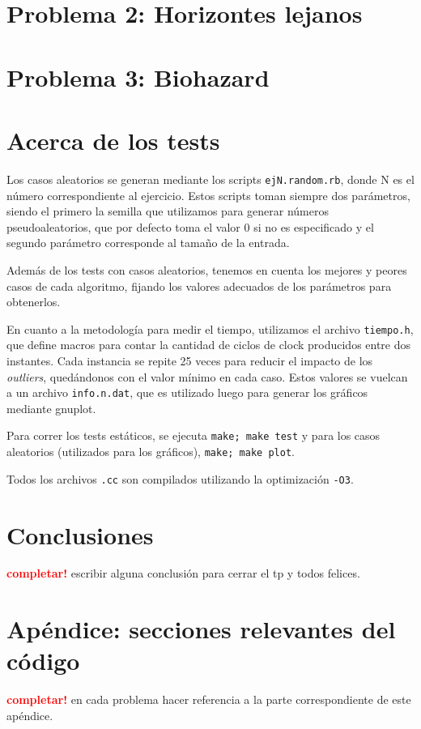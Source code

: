 \documentclass[a4paper]{article}
\begin{document}
\newpage

\section{Problema 2: Horizontes lejanos}


\newpage

\section{Problema 3: Biohazard}


\newpage
\section{Acerca de los tests}
Los casos aleatorios se generan mediante los scripts \verb|ejN.random.rb|, donde 
N es el número correspondiente al ejercicio. Estos scripts toman siempre dos parámetros, 
siendo el primero la semilla que utilizamos para generar números pseudoaleatorios, que 
por defecto toma el valor 0 si no es especificado y el segundo parámetro corresponde 
al tamaño de la entrada. 

Además de los tests con casos aleatorios, tenemos en cuenta los mejores y peores 
casos de cada algoritmo, fijando los valores adecuados de los parámetros para 
obtenerlos.

En cuanto a la metodología para medir el tiempo, utilizamos el archivo \verb|tiempo.h|, 
que define macros para contar la cantidad de ciclos de clock producidos entre dos instantes. 
Cada instancia se repite 25 veces para reducir el impacto de los \textit{outliers}, quedándonos 
con el valor mínimo en cada caso. Estos valores se vuelcan a un archivo \verb|info.n.dat|, que 
es utilizado luego para generar los gráficos mediante gnuplot.

Para correr los tests estáticos, se ejecuta \verb|make; make test| y para los 
casos aleatorios (utilizados para los gráficos), \verb|make; make plot|. 

Todos los archivos \verb|.cc| son compilados utilizando la optimización \verb|-O3|. 
  

\newpage

\section{Conclusiones}
    \textcolor{red}{\textbf{completar!}} \medskip
    escribir alguna conclusión para cerrar el tp y todos felices.

\newpage

\section{Apéndice: secciones relevantes del código}
    \textcolor{red}{\textbf{completar!}} \medskip
    en cada problema hacer referencia a la parte correspondiente de este apéndice.
\end{document}
